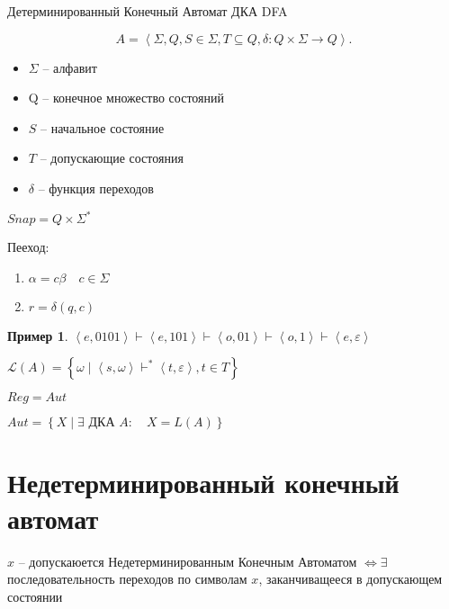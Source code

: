 \documentclass{book}
\theoremstyle{definition}
\newtheorem*{example}{Пример}
\begin{document}
\begin{definition}
    Детерминированный Конечный Автомат ДКА DFA

    \[
    A = \left<\Sigma, Q, S\in \Sigma, T\subseteq Q, \delta:Q\times \Sigma \to Q \right>
    .\] 

    \begin{itemize}
        \item $\Sigma$ -- алфавит
        \item Q -- конечное множество состояний
        \item  $S$ -- начальное состояние
        \item  $T$ -- допускающие состояния
        \item  $\delta$ -- функция переходов
    \end{itemize}

    $Snap = Q\times \Sigma^*$

    Пееход:
     \begin{tikzpicture}
        
    \end{tikzpicture}
    \begin{enumerate}
        \item $\alpha = c\beta\quad c\in \Sigma$
        \item  $r = \delta(q,c)$
    \end{enumerate}
\end{definition}

\begin{example}
    $\left<e,0101 \right> \vdash \left<e,101 \right> \vdash \left<o,01 \right> \vdash \left<o,1 \right> \vdash \left<e,\varepsilon \right>$
\end{example}

$\mathscr{L}(A) = \left\{ \omega \mid \left<s, \omega \right> \vdash^* \left<t, \varepsilon \right>, t\in T \right\} $

\begin{theorem}
    [Клини] $Reg = Aut$

    $Aut = \left\{ X\mid \exists \text{ ДКА } A:\quad X = L(A) \right\} $
\end{theorem}

\section{Недетерминированный конечный автомат}

$x$ -- допускаюется Недетерминированным Конечным Автоматом $\iff \exists $ последовательность переходов по символам $x$, заканчиващееся в допускающем состоянии
\end{document}
